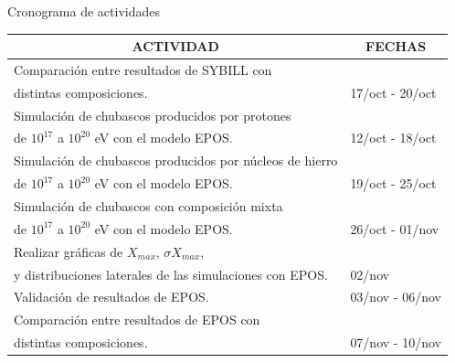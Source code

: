 \documentclass[10pt]{beamer}
\begin{document}
\begin{frame}{Cronograma de actividades}

\begin{footnotesize}
\begin{table}
\bgroup
\def\arraystretch{1.5}
\begin{tabular}{|l|l|}
\hline
\multicolumn{1}{|c|}{\textbf{ACTIVIDAD}}                                            & \multicolumn{1}{c|}{\textbf{FECHAS}} \\ \hline
Comparación entre resultados de SYBILL con \\distintas composiciones. 											& 17/oct - 20/oct			 \\ \hline
Simulación de chubascos producidos por protones \\de $10^{17}$ a $10^{20}$ eV con el modelo EPOS. 				& 12/oct - 18/oct             \\ \hline
Simulación de chubascos producidos por núcleos de hierro \\de $10^{17}$ a $10^{20}$ eV con el modelo EPOS. 		& 19/oct - 25/oct             \\ \hline
Simulación de chubascos con composición mixta \\de $10^{17}$ a $10^{20}$ eV con el modelo EPOS.   				& 26/oct - 01/nov             \\ \hline
Realizar gráficas de $X_{max}$, $\sigma X_{max}$, \\y distribuciones laterales de las simulaciones con EPOS.		& 02/nov  		              \\ \hline
Validación de resultados de EPOS.              																& 03/nov - 06/nov             \\ \hline
Comparación entre resultados de EPOS con \\distintas composiciones.              								& 07/nov - 10/nov             \\ \hline
\end{tabular}
\egroup
\end{table}
\end{footnotesize}
\end{frame}
\end{document}
